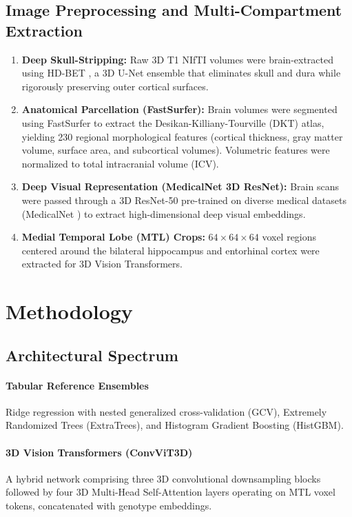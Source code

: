 \documentclass[journal,twocolumn]{IEEEtran}
\begin{document}
\subsection{Image Preprocessing and Multi-Compartment Extraction}
\begin{enumerate}
    \item \textbf{Deep Skull-Stripping:} Raw 3D T1 NIfTI volumes were brain-extracted using HD-BET \cite{isensee2019automated}, a 3D U-Net ensemble that eliminates skull and dura while rigorously preserving outer cortical surfaces.
    \item \textbf{Anatomical Parcellation (FastSurfer):} Brain volumes were segmented using FastSurfer \cite{henschel2020fastsurfer} to extract the Desikan-Killiany-Tourville (DKT) atlas, yielding 230 regional morphological features (cortical thickness, gray matter volume, surface area, and subcortical volumes). Volumetric features were normalized to total intracranial volume (ICV).
    \item \textbf{Deep Visual Representation (MedicalNet 3D ResNet):} Brain scans were passed through a 3D ResNet-50 pre-trained on diverse medical datasets (MedicalNet \cite{chen2019med3d}) to extract high-dimensional deep visual embeddings.
    \item \textbf{Medial Temporal Lobe (MTL) Crops:} $64 \times 64 \times 64$ voxel regions centered around the bilateral hippocampus and entorhinal cortex were extracted for 3D Vision Transformers.
\end{enumerate}

\section{Methodology}
\label{sec:methodology}

\subsection{Architectural Spectrum}
\paragraph{Tabular Reference Ensembles} Ridge regression with nested generalized cross-validation (GCV), Extremely Randomized Trees (ExtraTrees), and Histogram Gradient Boosting (HistGBM).
\paragraph{3D Vision Transformers (ConvViT3D)} A hybrid network comprising three 3D convolutional downsampling blocks followed by four 3D Multi-Head Self-Attention layers operating on MTL voxel tokens, concatenated with genotype embeddings.
\end{document}
